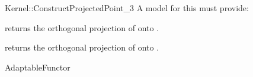 \begin{ccRefFunctionObjectConcept}{Kernel::ConstructProjectedPoint_3}
A model for this must provide:


       {returns the orthogonal projection of  onto .}

       {returns the orthogonal projection of  onto .}

\ccRefines
AdaptableFunctor

\ccSeeAlso
{} \\
 \\

\end{ccRefFunctionObjectConcept}
